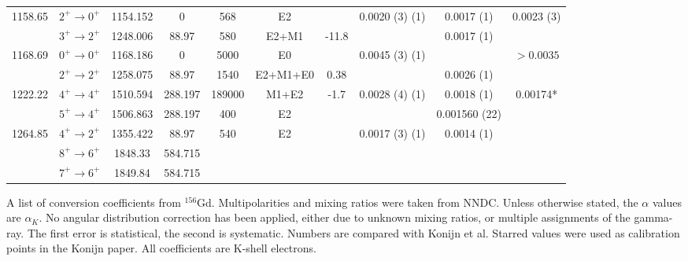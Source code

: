\begin{landscape}
\begin{longtable}{c|c|c|c|c|c|c|c|c|c}
1158.65	&	$2^+	\rightarrow	0^+$	&	1154.152	&	0	&	568	&	E2	&		&	0.0020 (3) (1)	&	0.0017 (1)	&	0.0023 (3)	\\
	&	$3^+	\rightarrow	2^+$	&	1248.006	&	88.97	&	580	&	E2+M1	&	-11.8	&		&	0.0017 (1)	&		\\ \hline
1168.69	&	$0^+	\rightarrow	0^+$	&	1168.186	&	0	&	5000	&	E0	&		&	0.0045 (3) (1)	&		&	$>0.0035$	\\
	&	$2^+	\rightarrow	2^+$	&	1258.075	&	88.97	&	1540	&	E2+M1+E0	&	0.38	&		&	0.0026 (1)	&		\\ \hline
1222.22	&	$4^+	\rightarrow	4^+$	&	1510.594	&	288.197	&	189000	&	M1+E2	&	-1.7	&	0.0028 (4) (1)	&	0.0018 (1)	&	0.00174*	\\
	&	$5^+	\rightarrow	4^+$	&	1506.863	&	288.197	&	400	&	E2	&		&		&	0.001560 (22)	&	\\ \hline
1264.85	&	$4^+	\rightarrow	2^+$	&	1355.422	&	88.97	&	540	&	E2	&		&	0.0017 (3) (1)	&	0.0014 (1)	&	\\
	&	$8^+	\rightarrow	6^+$	&	1848.33	&	584.715	&		&		&		&		&		&		\\
	&	$7^+	\rightarrow	6^+$	&	1849.84	&	584.715	&		&		&		&		&		&		\\ \bottomrule
    \end{longtable}
    \caption{A list of conversion coefficients from $^{156}$Gd. Multipolarities and mixing ratios were taken from NNDC. Unless otherwise stated, the $\alpha$ values are $\alpha_K$. No angular distribution correction has been applied, either due to unknown mixing ratios, or multiple assignments of the gamma-ray. The first error is statistical, the second is systematic. Numbers are compared with Konijn et al. \citep{konjin81:_156gd} Starred values were used as calibration points in the Konijn paper. All coefficients are K-shell electrons.}
\end{landscape}